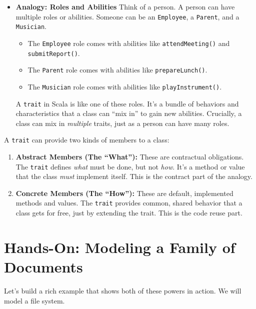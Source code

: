\documentclass[
  letterpaper,
  DIV=11,
  numbers=noendperiod]{scrreprt}
\providecommand{\tightlist}{%
  \setlength{\itemsep}{0pt}\setlength{\parskip}{0pt}}
\begin{document}
\begin{itemize}
\tightlist
\item
  \textbf{Analogy: Roles and Abilities} Think of a person. A person can
  have multiple roles or abilities. Someone can be an \texttt{Employee},
  a \texttt{Parent}, and a \texttt{Musician}.

  \begin{itemize}
  \tightlist
  \item
    The \texttt{Employee} role comes with abilities like
    \texttt{attendMeeting()} and \texttt{submitReport()}.
  \item
    The \texttt{Parent} role comes with abilities like
    \texttt{prepareLunch()}.
  \item
    The \texttt{Musician} role comes with abilities like
    \texttt{playInstrument()}.
  \end{itemize}

  A \texttt{trait} in Scala is like one of these roles. It's a bundle of
  behaviors and characteristics that a class can ``mix in'' to gain new
  abilities. Crucially, a class can mix in \emph{multiple} traits, just
  as a person can have many roles.
\end{itemize}

A \texttt{trait} can provide two kinds of members to a class:

\begin{enumerate}
\def\labelenumi{\arabic{enumi}.}
\tightlist
\item
  \textbf{Abstract Members (The ``What''):} These are contractual
  obligations. The \texttt{trait} defines \emph{what} must be done, but
  not \emph{how}. It's a method or value that the class \emph{must}
  implement itself. This is the contract part of the analogy.
\item
  \textbf{Concrete Members (The ``How''):} These are default,
  implemented methods and values. The \texttt{trait} provides common,
  shared behavior that a class gets for free, just by extending the
  trait. This is the code reuse part.
\end{enumerate}

\section{Hands-On: Modeling a Family of
Documents}\label{hands-on-modeling-a-family-of-documents}

Let's build a rich example that shows both of these powers in action. We
will model a file system.
\end{document}
